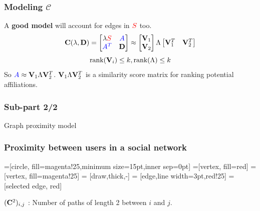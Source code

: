 \documentclass{beamer}
\begin{document}
\begin{frame}
\frametitle{Modeling $\mathcal{C}$}
\begin{itemize}
\pitem A \textbf{good model} will account for edges in $\textcolor{red}{S}$ too. 
\pause
\[\mathbf{C}(\lambda, \mathbf{D}) = \begin{bmatrix} \lambda \textcolor{red}{S}& \textcolor{blue}{A} \\ \textcolor{blue}{A^{T}}& \mathbf{D}\end{bmatrix} \approx \begin{bmatrix} \mathbf{V}_1 \\ \mathbf{V}_2 \end{bmatrix} \Lambda \begin{bmatrix} \mathbf{V}_1^{T} & \mathbf{V}_2^{T} \end{bmatrix}\]
\[\text{rank}(\mathbf{V}_i) \leq k, \text{rank}(\Lambda) \leq k \]
\pitem So $\textcolor{blue}{A} \approx \mathbf{V}_1 \Lambda \mathbf{V}_2^T$.
\pitem $\mathbf{V}_1 \Lambda \mathbf{V}_2^T$ is a similarity score matrix for ranking potential affiliations.
\end{itemize}
\end{frame}

\begin{frame}{}
 \frametitle{Sub-part 2/2}
  \hspace{1.1in}
  \centerline{\huge{Graph proximity model}}
\end{frame}

\begin{frame}
\frametitle{Proximity between users in a social network}
=[circle, fill=magenta!25,minimum size=15pt,inner sep=0pt]
=[vertex, fill=red]
=[vertex, fill=magenta!25]
 = [draw,thick,-]
 = [edge,line width=3pt,red!25]
 = [selected edge, red]

\begin{center}
\end{center}
\pause
$(\mathbf{C}^{2})_{i,j}$ : Number of paths of length 2 between $i$ and $j$.
\end{frame}
\end{document}
